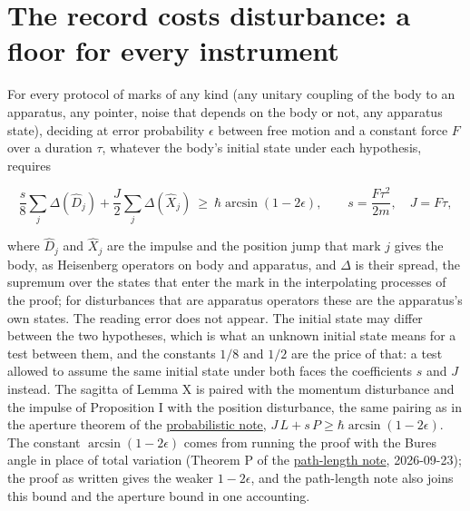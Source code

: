 \documentclass[11pt,a4paper]{article}
\begin{document}
\hypertarget{the-record-costs-disturbance-a-floor-for-every-instrument}{%
\section{The record costs disturbance: a floor for every
instrument}\label{the-record-costs-disturbance-a-floor-for-every-instrument}}

For every protocol of marks of any kind (any unitary coupling of the
body to an apparatus, any pointer, noise that depends on the body or
not, any apparatus state), deciding at error probability \(\epsilon\)
between free motion and a constant force \(F\) over a duration \(\tau\),
whatever the body's initial state under each hypothesis, requires

\[\boxed{\;\frac s8\sum_j\Delta(\hat D_j)+\frac J2\sum_j\Delta(\hat X_j)\ \ge\ \hbar\arcsin(1-2\epsilon),
\qquad s=\frac{F\tau^2}{2m},\quad J=F\tau,\;}\]

where \(\hat D_j\) and \(\hat X_j\) are the impulse and the position
jump that mark \(j\) gives the body, as Heisenberg operators on body and
apparatus, and \(\Delta\) is their spread, the supremum over the states
that enter the mark in the interpolating processes of the proof; for
disturbances that are apparatus operators these are the apparatus's own
states. The reading error does not appear. The initial state may differ
between the two hypotheses, which is what an unknown initial state means
for a test between them, and the constants \(1/8\) and \(1/2\) are the
price of that: a test allowed to assume the same initial state under
both faces the coefficients \(s\) and \(J\) instead. The sagitta of
Lemma X is paired with the momentum disturbance and the impulse of
Proposition I with the position disturbance, the same pairing as in the
aperture theorem of the \href{planck-gap-probabilistic.md}{probabilistic
note}, \(J\,L+s\,P\ge\hbar\arcsin(1-2\epsilon)\). The constant
\(\arcsin(1-2\epsilon)\) comes from running the proof with the Bures
angle in place of total variation (Theorem P of the
\href{record-distance-path-length.md}{path-length note}, 2026-09-23);
the proof as written gives the weaker \(1-2\epsilon\), and the
path-length note also joins this bound and the aperture bound in one
accounting.
\end{document}
